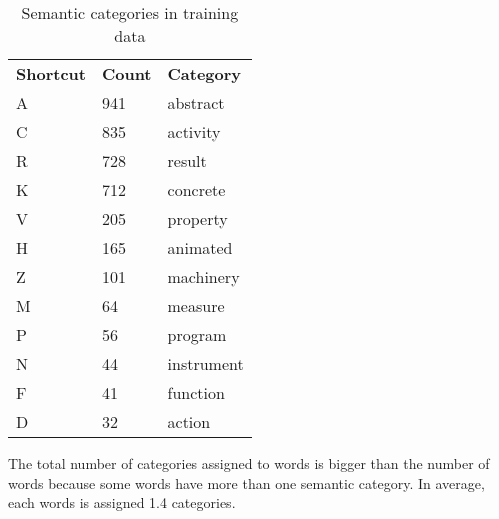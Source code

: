 \documentclass[letterpaper]{article}
\newcommand{\todofn}[1] {
 \footnote{\textbf{TODO : #1}}}
\begin{document}
\begin{table}
\begin{tabular}{|l|l|l|}
 \hline
\textbf{Shortcut} &  \textbf{Count} & \textbf{Category}\\
A & 941 & abstract \\ \hline
C & 835 & activity \\ \hline
R & 728 & result \\ \hline
K & 712 & concrete \\ \hline
V & 205 & property \\ \hline
H & 165 & animated \\ \hline
Z & 101 & machinery \\ \hline
M & 64 & measure\\ \hline
P & 56 & program \\ \hline
N & 44 & instrument \\ \hline
F & 41 & function \\ \hline
D & 32 & action \\ \hline

\end{tabular}
\caption{Semantic categories in training data}
\end{table}


The total number of categories assigned to words is bigger than the number of words because some words have more than one semantic category. In average, each words is assigned 1.4 categories.


\end{document}
